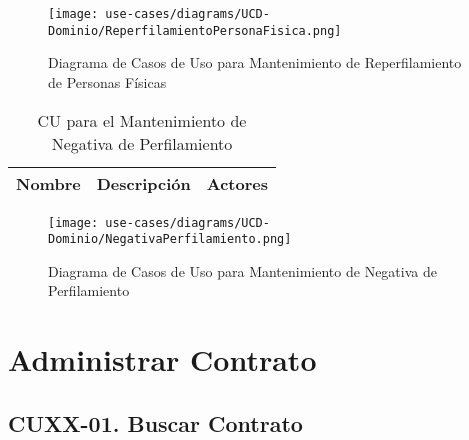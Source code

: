 	\begin{figure}[H]
		\begin{center}
		\label{tab:ucd-entity-reperfilamientopersonafisica}
		\texttt{[image: use-cases/diagrams/UCD-Dominio/ReperfilamientoPersonaFisica.png]}
		\caption{Diagrama de Casos de Uso para Mantenimiento de Reperfilamiento de Personas F\'isicas}
		\end{center}
	\end{figure}
	\begin{table}[H]
		\caption{CU para el Mantenimiento de Negativa de Perfilamiento}
		\label{uc-entity-negativaperfilamiento}
		\begin{center}
		\begin{tabularx}{0.90\linewidth}{ X X X }
			\hline
			\textbf{Nombre} & \textbf{Descripci\'on} & \textbf{Actores} \\
			\hline
			\hline
		\end{tabularx}
		\end{center}
	\end{table}
	
	\begin{figure}[H]
		\begin{center}
		\label{tab:ucd-entity-negativaperfilamiento}
		\texttt{[image: use-cases/diagrams/UCD-Dominio/NegativaPerfilamiento.png]}
		\caption{Diagrama de Casos de Uso para Mantenimiento de Negativa de Perfilamiento}
		\end{center}
	\end{figure}
	\clearpage
	\section{Administrar Contrato} \label{sec:cf-uc-admin-contrato}
	
	\subsection{CUXX-01. Buscar Contrato} \label{sec:cu-search-Contrato}
	
